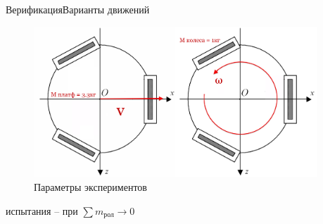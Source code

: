 \documentclass{beamer}
\begin{document}
\begin{frame}{Верификация}{Варианты движений}
    \begin{figure}[!ht]
        \centering
        \includegraphics[width=0.95\textwidth]{content/parts/3_friction/diploma/img/art/my_exp_setup.png}
        \caption{Параметры экспериментов}
        \label{fig:my_exp_setup}
    \end{figure}
    испытания -- при $\sum m_{\text{рол}} \rightarrow 0$
\end{frame}
\end{document}
